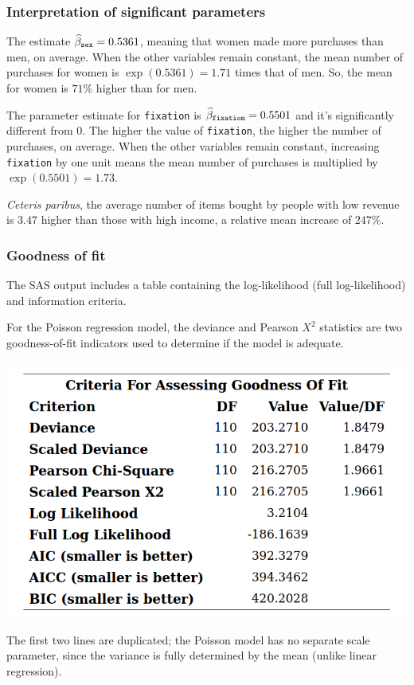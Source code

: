 \documentclass{beamer}
\begin{document}
\begin{frame}[fragile]
\frametitle{Interpretation of significant parameters}
\bi
\item The estimate $\widehat{\beta}_{\texttt{sex}}=0.5361$, meaning that \alert{women made more purchases than men, on average}. When the other variables remain constant, the mean number of purchases for women is 
$\exp(0.5361) = 1.71$ times that of men. So, the mean for women is $71$\% higher than for men.
\item The parameter estimate for \texttt{fixation} is $\widehat{\beta}_{\texttt{fixation}}=0.5501$ and it's significantly different from $0$.
The higher the value of \texttt{fixation}, the higher the number of purchases, on average. When the other variables remain constant, increasing
\texttt{fixation} by one unit means the mean number of purchases is multiplied by $\exp(0.5501) =
1.73$.
\item \textit{Ceteris paribus}, the average number of items bought by people with low revenue is $3.47$ higher than those with high income, a relative mean increase of $247$\%.
\ei
\end{frame}
\begin{frame}
 \frametitle{Goodness of fit}
 {\small 
\bi \item  The SAS output includes a table containing the log-likelihood (full log-likelihood) and information criteria. 
\item For the Poisson regression model, the deviance and Pearson $X^2$ statistics are two goodness-of-fit indicators used to determine if the model is adequate.\ei
}
\begin{center}
 \includegraphics[width = 0.7\linewidth]{img/c4/slides8-e3}
 \end{center}
 {\tiny
 The first two lines are duplicated; the Poisson model has no separate scale parameter, since the variance is fully determined by the mean (unlike linear regression).
 
 }
\end{frame}
\end{document}
